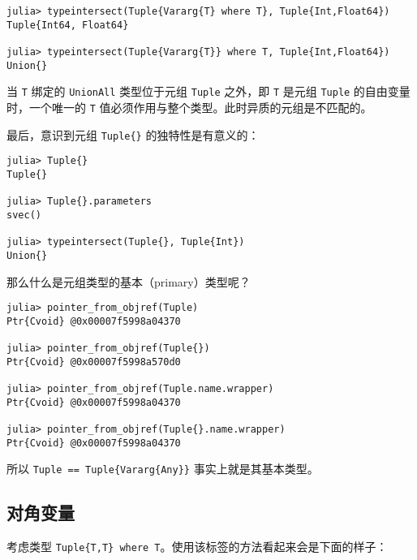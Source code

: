 \begin{verbatim}
julia> typeintersect(Tuple{Vararg{T} where T}, Tuple{Int,Float64})
Tuple{Int64, Float64}

julia> typeintersect(Tuple{Vararg{T}} where T, Tuple{Int,Float64})
Union{}
\end{verbatim}



当 \texttt{T} 绑定的 \texttt{UnionAll} 类型位于元组 \texttt{Tuple} 之外，即 \texttt{T} 是元组 \texttt{Tuple} 的自由变量时，一个唯一的 \texttt{T} 值必须作用与整个类型。此时异质的元组是不匹配的。



最后，意识到元组 \texttt{Tuple\{\}} 的独特性是有意义的：




\begin{verbatim}
julia> Tuple{}
Tuple{}

julia> Tuple{}.parameters
svec()

julia> typeintersect(Tuple{}, Tuple{Int})
Union{}
\end{verbatim}



那么什么是元组类型的基本（primary）类型呢？




\begin{verbatim}
julia> pointer_from_objref(Tuple)
Ptr{Cvoid} @0x00007f5998a04370

julia> pointer_from_objref(Tuple{})
Ptr{Cvoid} @0x00007f5998a570d0

julia> pointer_from_objref(Tuple.name.wrapper)
Ptr{Cvoid} @0x00007f5998a04370

julia> pointer_from_objref(Tuple{}.name.wrapper)
Ptr{Cvoid} @0x00007f5998a04370
\end{verbatim}



所以 \texttt{Tuple == Tuple\{Vararg\{Any\}\}} 事实上就是其基本类型。



\hypertarget{14276380726498563975}{}


\subsection{对角变量}



考虑类型 \texttt{Tuple\{T,T\} where T}。使用该标签的方法看起来会是下面的样子：




